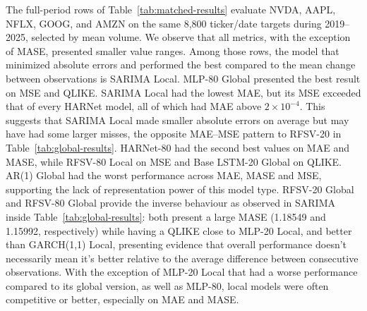\documentclass[12pt,a4paper]{article}
\numberwithin{equation}{section}
\numberwithin{table}{section}
\numberwithin{figure}{section}
\begin{document}
The full-period rows of Table~\ref{tab:matched-results} evaluate NVDA, AAPL, NFLX, GOOG, and AMZN on the same 8,800 ticker/date targets during 2019--2025, selected by mean volume. We observe that all metrics, with the exception of MASE, presented smaller value ranges. Among those rows, the model that minimized absolute errors and performed the best compared to the mean change between observations is SARIMA Local. MLP-80 Global presented the best result on MSE and QLIKE. SARIMA Local had the lowest MAE, but its MSE exceeded that of every HARNet model, all of which had MAE above $2\times10^{-4}$. This suggests that SARIMA Local made smaller absolute errors on average but may have had some larger misses, the opposite MAE--MSE pattern to RFSV-20 in Table~\ref{tab:global-results}. HARNet-80 had the second best values on MAE and MASE, while RFSV-80 Local on MSE and Base LSTM-20 Global on QLIKE. AR(1) Global had the worst performance across MAE, MASE and MSE, supporting the lack of representation power of this model type. RFSV-20 Global and RFSV-80 Global provide the inverse behaviour as observed in SARIMA inside Table~\ref{tab:global-results}: both present a large MASE (1.18549 and 1.15992, respectively) while having a QLIKE close to MLP-20 Local, and better than GARCH(1,1) Local, presenting evidence that overall performance doesn't necessarily mean it's better relative to the average difference between consecutive observations. With the exception of MLP-20 Local that had a worse performance compared to its global version, as well as MLP-80, local models were often competitive or better, especially on MAE and MASE.
\end{document}
